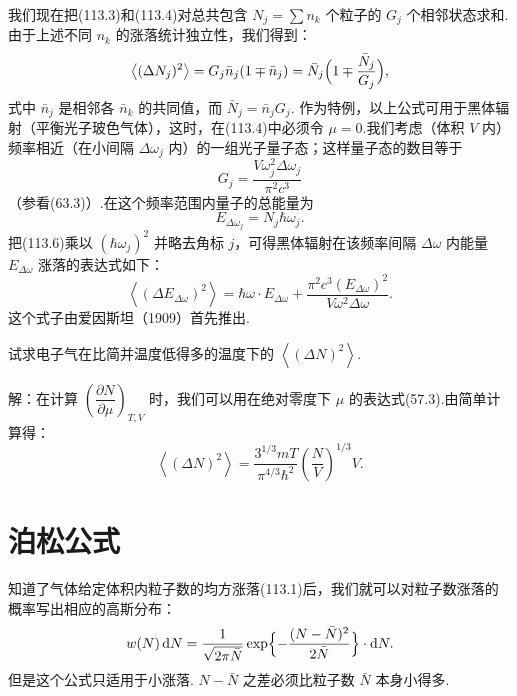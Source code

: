 我们现在把(113.3)和(113.4)对总共包含 $N_{j}=\sum n_{k}$ 个粒子的 $G_{j}$ 个相邻状态求和.由于上述不同 $n_{k}$ 的涨落统计独立性，我们得到：
\begin{equation}
  \left\langle(\Delta N_{j})^{2}\right\rangle
  =G_{j}\bar{n}_{j}(1\mp\bar{n}_{j})
  =\bar{N}_{j}\Bigl(1\mp\frac{\bar{N}_{j}}{G_{j}}\Bigr),
\end{equation}
式中 $\bar{n}_{j}$ 是相邻各 $\bar{n}_{k}$ 的共同值，而 $\bar{N}_{j}=\bar{n}_{j}G_{j}$.
作为特例，以上公式可用于黑体辐射（平衡光子玻色气体），这时，在(113.4)中必须令
$\mu=0$.我们考虑（体积 $V$ 内）频率相近（在小间隔 $\Delta\omega_{j}$ 内）的一组光子量子态；这样量子态的数目等于
\begin{equation*}
  G_{j}=\frac{V\omega_{j}^{2}\Delta\omega_{j}}{\pi^{2}c^{3}}
\end{equation*}
（参看(63.3)）.在这个频率范围内量子的总能量为
\begin{equation*}
  E_{\Delta\omega_{j}}=N_{j}\hbar\omega_{j}.
\end{equation*}
把(113.6)乘以 $(\hbar\omega_{j})^{2}$ 并略去角标 $j$，可得黑体辐射在该频率间隔
$\Delta\omega$ 内能量 $E_{\Delta\omega}$ 涨落的表达式如下：
\begin{equation}
  \left\langle(\Delta E_{\Delta\omega})^{2}\right\rangle
  =\hbar\omega\cdot E_{\Delta\omega}
  +\frac{\pi^{2}c^{3}(E_{\Delta\omega})^{2}}{V\omega^{2}\Delta\omega}.
\end{equation}
这个式子由爱因斯坦（1909）首先推出.

\begin{xiti}

试求电子气在比简并温度低得多的温度下的 $\left\langle(\Delta N)^{2}\right\rangle$.

解：在计算 $\left(\dfrac{\partial N}{\partial\mu}\right)_{T,V}$ 时，我们可以用在绝对零度下
$\mu$ 的表达式(57.3).由简单计算得：
\begin{equation*}
  \left\langle(\Delta N)^{2}\right\rangle
  =\frac{3^{1/3}mT}{\pi^{4/3}\hbar^{2}}
  \left(\frac{N}{V}\right)^{1/3}V.
\end{equation*}

\end{xiti}

\section{泊松公式}

知道了气体给定体积内粒子数的均方涨落(113.1)后，我们就可以对粒子数涨落的概率写出相应的高斯分布：
\begin{equation}
  w(N)\,\mathrm{d}N=\frac{1}{\sqrt{2\pi\bar{N}}}
  \exp\Bigl\{-\frac{(N-\bar{N})^{2}}{2\bar{N}}\Bigr\}\cdot\mathrm{d}N.
\end{equation}
但是这个公式只适用于小涨落. $N-\bar{N}$ 之差必须比粒子数 $\bar{N}$ 本身小得多.

